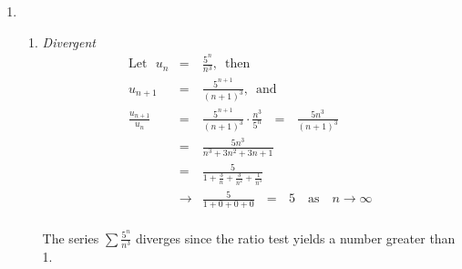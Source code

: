 \documentclass[12pt]{amsart}
\begin{document}
\begin{enumerate}
\begin{enumerate}
		\end{enumerate}
	
	\item
	
		\begin{enumerate}
				
			\item \emph{Divergent}
				\begin{eqnarray}
					\text{Let} \text{ } u_n & = & \frac{5^n}{n^3} \text{, } \text{ then} \nonumber \\
					u_{n+1} & = & \frac{5^{n+1}}{(n+1)^3} \text{, } \text{ and} \nonumber \\
					\frac{u_{n+1}}{u_n} & = & \frac{5^{n+1}}{(n+1)^3} \cdot \frac{n^3}{5^n} \text{ } =
					\text{ } \frac{5n^3}{(n+1)^3} \nonumber \\
					& = & \frac{5n^3}{n^3+3n^2+3n+1} \nonumber \\
					& = & \frac{5}{1+\frac{3}{n}+\frac{3}{n^2}+\frac{1}{n^3}} \nonumber \\
					& \longrightarrow & \frac{5}{1+0+0+0} \text{ } = \text{ } 5 \text{ } \text{ as } \text{ } n
					\longrightarrow \infty \nonumber
				\end{eqnarray}\\
			The series $\sum \frac{5^n}{n^3}$ diverges since the ratio test yields a number greater than 				1.
								

\end{enumerate}
\end{enumerate}
\end{document}

